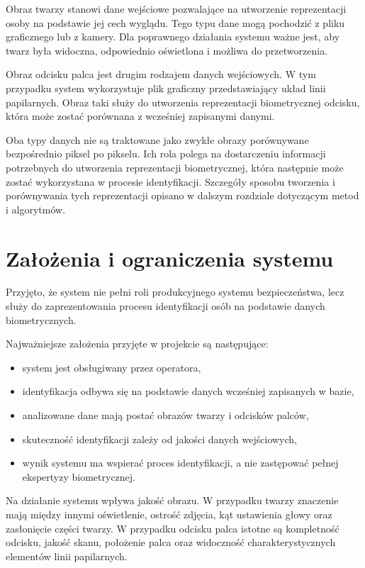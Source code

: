 Obraz twarzy stanowi dane wejściowe pozwalające na utworzenie reprezentacji osoby na podstawie jej cech wyglądu. Tego typu dane mogą pochodzić z pliku graficznego lub z kamery. Dla poprawnego działania systemu ważne jest, aby twarz była widoczna, odpowiednio oświetlona i możliwa do przetworzenia.

Obraz odcisku palca jest drugim rodzajem danych wejściowych. W tym przypadku system wykorzystuje plik graficzny przedstawiający układ linii papilarnych. Obraz taki służy do utworzenia reprezentacji biometrycznej odcisku, która może zostać porównana z wcześniej zapisanymi danymi.

Oba typy danych nie są traktowane jako zwykłe obrazy porównywane bezpośrednio piksel po pikselu. Ich rola polega na dostarczeniu informacji potrzebnych do utworzenia reprezentacji biometrycznej, która następnie może zostać wykorzystana w procesie identyfikacji. Szczegóły sposobu tworzenia i porównywania tych reprezentacji opisano w dalszym rozdziale dotyczącym metod i algorytmów.

\newpage

\section{Założenia i ograniczenia systemu}

Przyjęto, że system nie pełni roli produkcyjnego systemu bezpieczeństwa, lecz służy do zaprezentowania procesu identyfikacji osób na podstawie danych biometrycznych.

Najważniejsze założenia przyjęte w projekcie są następujące:
\begin{itemize}
    \item system jest obsługiwany przez operatora,
    \item identyfikacja odbywa się na podstawie danych wcześniej zapisanych w bazie,
    \item analizowane dane mają postać obrazów twarzy i odcisków palców,
    \item skuteczność identyfikacji zależy od jakości danych wejściowych,
    \item wynik systemu ma wspierać proces identyfikacji, a nie zastępować pełnej ekspertyzy biometrycznej.
\end{itemize}

Na działanie systemu wpływa jakość obrazu. W przypadku twarzy znaczenie mają między innymi oświetlenie, ostrość zdjęcia, kąt ustawienia głowy oraz zasłonięcie części twarzy. W przypadku odcisku palca istotne są kompletność odcisku, jakość skanu, położenie palca oraz widoczność charakterystycznych elementów linii papilarnych.

